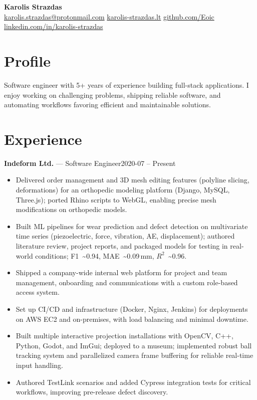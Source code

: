 \documentclass[10pt,a4paper]{article}
\makeatletter
\newcommand{\entry}[3]{\noindent\textbf{#1} — #2\hfill #3\\}
\newcommand{\Name}{Karolis Strazdas}
\newcommand{\Email}{karolis.strazdas@protonmail.com}
\newcommand{\Website}{https://karolis-strazdas.lt}
\newcommand{\GitHub}{https://github.com/Eoic}
\newcommand{\LinkedIn}{https://www.linkedin.com/in/karolis-strazdas/}
\makeatother
\begin{document}
\pagestyle{empty}

\begin{center}
{\Huge\bfseries \Name}\\[0.8em]
\small \href{mailto:\Email}{\Email} \quad\textbullet\quad \href{\Website}{karolis-strazdas.lt} \quad\textbullet\quad \href{\GitHub}{github.com/Eoic} \quad\textbullet\quad \href{\LinkedIn}{linkedin.com/in/karolis-strazdas}
\end{center}

\vspace{-0.65em}

\begingroup\small

\section*{Profile}
Software engineer with 5+ years of experience building full-stack applications. I enjoy working on challenging problems, shipping reliable software, and automating workflows favoring efficient and maintainable solutions.

\section*{Experience}
\entry{Indeform Ltd.}{Software Engineer}{2020-07 -- Present}
\vspace{-0.8em}
\begin{itemize}[leftmargin=*,itemsep=0.0em,topsep=0.02em]
  \item Delivered order management and 3D mesh editing features (polyline slicing, deformations) for an orthopedic modeling platform (Django, MySQL, Three.js); ported Rhino scripts to WebGL, enabling precise mesh modifications on orthopedic models.
  \item Built ML pipelines for wear prediction and defect detection on multivariate time series (piezoelectric, force, vibration, AE, displacement); authored literature review, project reports, and packaged models for testing in real-world conditions; F1~\textasciitilde0.94, MAE~\textasciitilde0.09\,mm, $R^2$~\textasciitilde0.96.
  \item Shipped a company\mbox{-}wide internal web platform for project and team management, onboarding and communications with a custom role\mbox{-}based access system.
  \item Set up CI/CD and infrastructure (Docker, Nginx, Jenkins) for deployments on AWS EC2 and on\mbox{-}premises, with load balancing and minimal downtime.
  \item Built multiple interactive projection installations with OpenCV, C++, Python, Godot, and ImGui; deployed to a museum; implemented robust ball tracking system and parallelized camera frame buffering for reliable real-time input handling.
  \item Authored TestLink scenarios and added Cypress integration tests for critical workflows, improving pre\mbox{-}release defect discovery.
\end{itemize}
\end{document}
